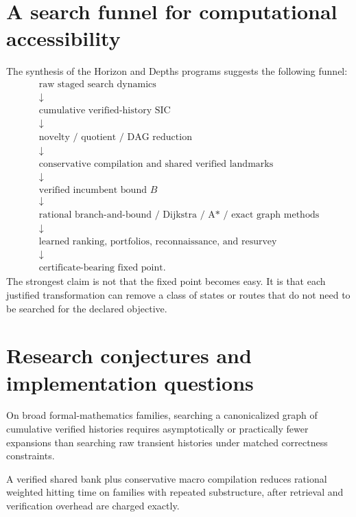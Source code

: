 \section{A search funnel for computational accessibility}
The synthesis of the Horizon and Depths programs suggests the following funnel:
\[
\begin{array}{c}
\text{raw staged search dynamics}\\[2pt]
\downarrow\\[2pt]
\text{cumulative verified-history SIC}\\[2pt]
\downarrow\\[2pt]
\text{novelty / quotient / DAG reduction}\\[2pt]
\downarrow\\[2pt]
\text{conservative compilation and shared verified landmarks}\\[2pt]
\downarrow\\[2pt]
\text{verified incumbent bound }B\\[2pt]
\downarrow\\[2pt]
\text{rational branch-and-bound / Dijkstra / A* / exact graph methods}\\[2pt]
\downarrow\\[2pt]
\text{learned ranking, portfolios, reconnaissance, and resurvey}\\[2pt]
\downarrow\\[2pt]
\text{certificate-bearing fixed point.}
\end{array}
\]
The strongest claim is not that the fixed point becomes easy. It is that each justified transformation can remove a class of states or routes that do not need to be searched for the declared objective.

\section{Research conjectures and implementation questions}
\begin{conjecture}
On broad formal-mathematics families, searching a canonicalized graph of cumulative verified histories requires asymptotically or practically fewer expansions than searching raw transient histories under matched correctness constraints.
\end{conjecture}

\begin{conjecture}
A verified shared bank plus conservative macro compilation reduces rational weighted hitting time on families with repeated substructure, after retrieval and verification overhead are charged exactly.
\end{conjecture}

